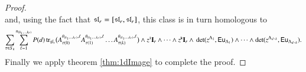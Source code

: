 \documentclass[main.tex]{subfiles}
\begin{document}
\begin{proof}
\[\]
    and, using the fact that $\mathfrak{sl}_r=[\mathfrak{sl}_r,\mathfrak{sl}_r]$, this class is in turn homologous to
     \[
\sum_{\tau \in S_k} \sum_{\ell=1}^{n_{(k_1,\ldots,k_r)}} 
P(d)\,
\mathrm{tr}_{\mathfrak{gl}_r}\big(A^{\theta_{(k_1,\ldots,k_r)},\ell}_{\tau(0)}A^{\theta_{(k_1,\ldots,k_r)},\ell}_{\tau(1)}\ldots A^{\theta_{(k_1,\ldots,k_r)},\ell}_{\tau(k)} \big) \wedge z^{{\textbf{\texttt{\tiny{1}}}}}\mathbf{I}_r \wedge \cdots \wedge z^{\textbf{\texttt{\tiny{k}}}}\mathbf{I}_r \wedge \,\det(z^{\Lambda_1},\mathsf{Eu}_{\Lambda_1}) \wedge \cdots \wedge \det(z^{\Lambda_{d-k}},\mathsf{Eu}_{\Lambda_{d-k}}).
\]
Finally we apply theorem \ref{thm:1dImage} to complete the proof.
  \end{proof}
\end{document}
